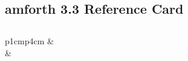 \documentclass[a4paper,10pt]{article}
\def\colsa{p{1cm}p{4cm}}
\begin{document}
\thispagestyle{empty}
\pagestyle{empty}

\begin{footnotesize}
\section*{\Large amforth 3.3 Reference Card}
\begin{multicols}{3}

\subsection*{}
\begin{tabular}{\colsa}
% 
\verb||  & \verb//\\
              & \verb//\\
\end{tabular}


\end{multicols}
\end{footnotesize}
\end{document}
